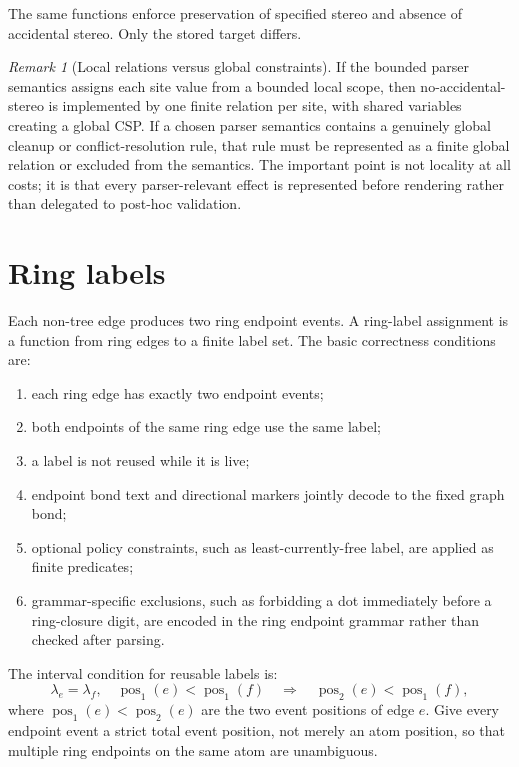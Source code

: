 \documentclass[10pt,a4paper]{article}
\newcommand{\pos}{\operatorname{pos}}
\theoremstyle{definition}
\theoremstyle{remark}
\newtheorem{remark}[lemma]{Remark}
\begin{document}
The same functions enforce preservation of specified stereo and absence of
accidental stereo.  Only the stored target differs.

\begin{remark}[Local relations versus global constraints]
If the bounded parser semantics assigns each site value from a bounded local
scope, then no-accidental-stereo is implemented by one finite relation per site,
with shared variables creating a global CSP.  If a chosen parser semantics
contains a genuinely global cleanup or conflict-resolution rule, that rule must
be represented as a finite global relation or excluded from the semantics.  The
important point is not locality at all costs; it is that every parser-relevant
effect is represented before rendering rather than delegated to post-hoc
validation.
\end{remark}

\section{Ring labels}
\label{s:ring-labels}

Each non-tree edge produces two ring endpoint events.  A ring-label assignment
is a function from ring edges to a finite label set.  The basic correctness
conditions are:
\begin{enumerate}[leftmargin=*]
\item each ring edge has exactly two endpoint events;
\item both endpoints of the same ring edge use the same label;
\item a label is not reused while it is live;
\item endpoint bond text and directional markers jointly decode to the fixed
      graph bond;
\item optional policy constraints, such as least-currently-free label, are
      applied as finite predicates;
\item grammar-specific exclusions, such as forbidding a dot immediately before a
      ring-closure digit, are encoded in the ring endpoint grammar rather than
      checked after parsing.
\end{enumerate}

The interval condition for reusable labels is:
\[
  \lambda_e=\lambda_f,\quad \pos_1(e)<\pos_1(f)
  \quad\Longrightarrow\quad
  \pos_2(e)<\pos_1(f),
\]
where \(\pos_1(e)<\pos_2(e)\) are the two event positions of edge \(e\).  Give
every endpoint event a strict total event position, not merely an atom position,
so that multiple ring endpoints on the same atom are unambiguous.
\end{document}
